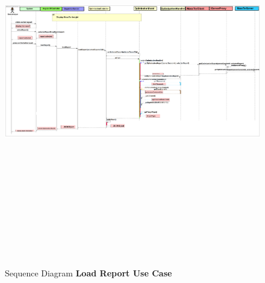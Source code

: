 	\begin{figure}[h]
		\centering
		\includegraphics[width=17.5cm,height=17cm]{SequenceDiagramLoadReport.png}
		\caption{Sequence Diagram \textbf{Load Report Use Case}}
	\end{figure}


	\pagebreak
	\clearpage
	\newpage

